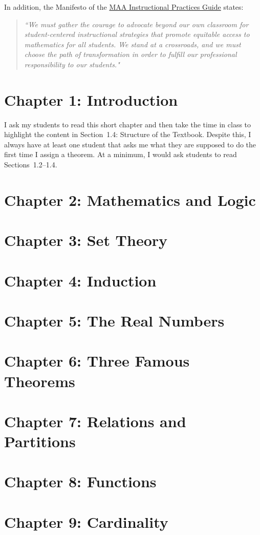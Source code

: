 \documentclass[11pt]{article}%
\begin{document}
In addition, the Manifesto of the \href{https://www.maa.org/programs-and-communities/curriculum%20resources/instructional-practices-guide}{MAA Instructional Practices Guide} states: 

\begin{quote}
\emph{``We must gather the courage to advocate beyond our own classroom for student-centered instructional strategies that promote equitable access to mathematics for all students. We stand at a crossroads, and we must choose the path of transformation in order to fulfill our professional responsibility to our students."}
\end{quote}

\section*{Chapter 1: Introduction}

I ask my students to read this short chapter and then take the time in class to highlight the content in Section~1.4: Structure of the Textbook.  Despite this, I always have at least one student that asks me what they are supposed to do the first time I assign a theorem.  At a minimum, I would ask students to read Sections~1.2--1.4.

\section*{Chapter 2: Mathematics and Logic}

\section*{Chapter 3: Set Theory}

\section*{Chapter 4: Induction}

\section*{Chapter 5: The Real Numbers}

\section*{Chapter 6: Three Famous Theorems}

\section*{Chapter 7: Relations and Partitions}

\section*{Chapter 8: Functions}

\section*{Chapter 9: Cardinality}
\end{document}
